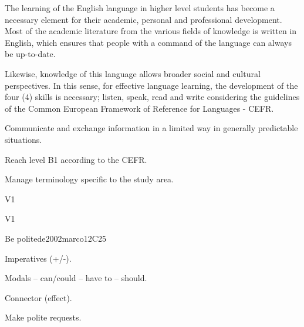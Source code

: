\begin{syllabus}


\begin{justification}
The learning of the English language in higher level students has become a necessary 
element for their academic, personal and professional development.
Most of the academic literature from the various fields of knowledge is written in English, 
which ensures that people with a command of the language can always be up-to-date.

Likewise, knowledge of this language allows broader social and cultural perspectives. 
In this sense, for effective language learning, the development of the four (4) 
skills is necessary; listen, speak, read and write considering the guidelines of the 
Common European Framework of Reference for Languages - CEFR.
\end{justification}

\begin{goals}
\item Communicate and exchange information in a limited way in 
      generally predictable situations.
\item Reach level B1 according to the CEFR.
\item Manage terminology specific to the study area.
\end{goals}

\begin{outcomes}{V1}
\item {}
\end{outcomes}

\begin{competences}{V1}
\item {}
\end{competences}

\begin{unit}{Be polite}{}{de2002marco}{12}{C25}
   \begin{topics}
      \item Imperatives (+/-).
      \item Modals – can/could – have to – should.
      \item Connector (effect).
   \end{topics}

   \begin{learningoutcomes}
      \item Make polite requests.
   \end{learningoutcomes}
\end{unit}


\end{syllabus}
